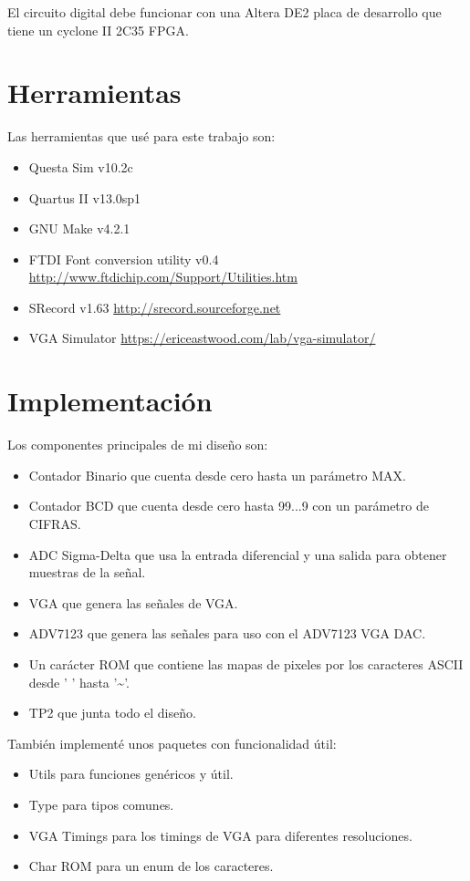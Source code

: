 \documentclass[a4paper]{article}
\begin{document}
El circuito digital debe funcionar con una Altera DE2 placa de desarrollo que tiene un cyclone II 2C35 FPGA.

\section{Herramientas}

Las herramientas que usé para este trabajo son:
\begin{itemize}[nosep]
\item Questa Sim v10.2c
\item Quartus II v13.0sp1
\item GNU Make v4.2.1
\item FTDI Font conversion utility v0.4 \url{http://www.ftdichip.com/Support/Utilities.htm}
\item SRecord v1.63 \url{http://srecord.sourceforge.net}
\item VGA Simulator \url{https://ericeastwood.com/lab/vga-simulator/}
\end{itemize}

\section{Implementación}

Los componentes principales de mi diseño son:
\begin{itemize}[nosep]
\item Contador Binario que cuenta desde cero hasta un parámetro MAX.
\item Contador BCD que cuenta desde cero hasta 99...9 con un parámetro de CIFRAS.
\item ADC Sigma-Delta que usa la entrada diferencial y una salida para obtener muestras de la señal.
\item VGA que genera las señales de VGA.
\item ADV7123 que genera las señales para uso con el ADV7123 VGA DAC.
\item Un carácter ROM que contiene las mapas de pixeles por los caracteres ASCII desde ' ' hasta '\textasciitilde'.
\item TP2 que junta todo el diseño.
\end{itemize}

\vspace{0.4cm}

También implementé unos paquetes con funcionalidad útil:
\begin{itemize}[nosep]
\item Utils para funciones genéricos y útil.
\item Type para tipos comunes.
\item VGA Timings para los timings de VGA para diferentes resoluciones.
\item Char ROM para un enum de los caracteres.
\end {itemize}
\end{document}
